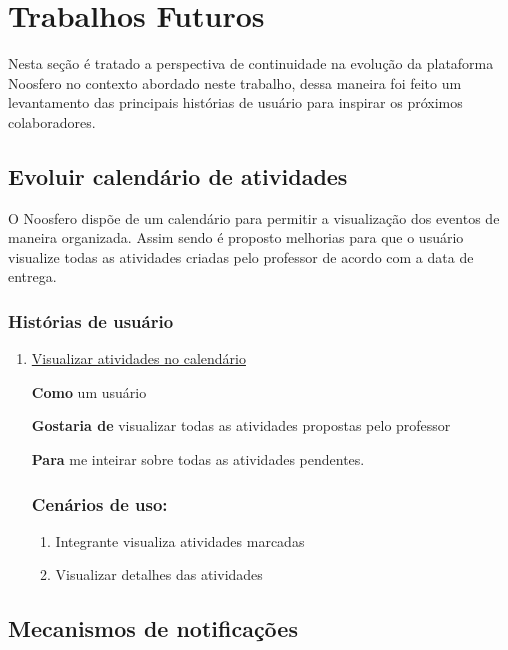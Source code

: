 \section{Trabalhos Futuros}

Nesta seção é tratado a perspectiva de continuidade na evolução da plataforma Noosfero no contexto abordado neste trabalho, dessa maneira foi feito um levantamento das principais histórias de usuário para inspirar os próximos colaboradores.

\subsection*{Evoluir calendário de atividades}

O Noosfero dispõe de um calendário para permitir a visualização dos eventos de maneira organizada. Assim sendo é proposto melhorias para que o usuário visualize todas as atividades criadas pelo professor de acordo com a data de entrega.

\subsubsection*{Histórias de usuário}
\begin{enumerate}
\item \underline{Visualizar atividades no calendário}

\textbf{Como} um usuário

\textbf{Gostaria de} visualizar todas as atividades propostas pelo professor

\textbf{Para} me inteirar sobre todas as atividades pendentes.

\subsubsection*{Cenários de uso:}
  \begin{enumerate}
  \item Integrante visualiza atividades marcadas
  \item Visualizar detalhes das atividades
  \end{enumerate}
\end{enumerate}

\subsection*{Mecanismos de notificações}

